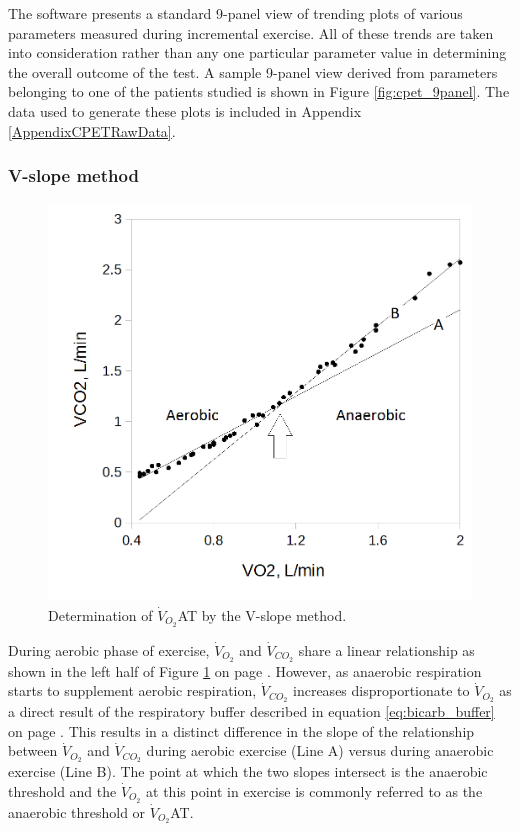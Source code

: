 The software presents a standard 9-panel view of trending plots of various parameters measured during incremental exercise. 
All of these trends are taken into consideration rather than any one particular parameter value in determining the overall outcome of the test. 
A sample 9-panel view derived from parameters belonging to one of the patients studied is shown in Figure \ref{fig:cpet_9panel}. 
The data used to generate these plots is included in Appendix \ref{AppendixCPETRawData}. 

\subsubsection{V-slope method}

\begin{figure}[htbp]
	\centering
	\includegraphics[width=\textwidth]{Figures/cpet_vslope}
	\caption{Determination of $\dot{V}_{O_2}$AT by the V-slope method.}
	\label{fig:cpet_vslope}
\end{figure}

During aerobic phase of exercise, $\dot{V}_{O_2}$ and $\dot{V}_{CO_2}$ share a linear relationship as shown in the left half of Figure \ref{fig:cpet_vslope} on page \pageref{fig:cpet_vslope}. 
However, as anaerobic respiration starts to supplement aerobic respiration, $\dot{V}_{CO_2}$ increases disproportionate to $\dot{V}_{O_2}$ as a direct result of the respiratory buffer described in equation \ref{eq:bicarb_buffer} on page \pageref{eq:bicarb_buffer}. 
This results in a distinct difference in the slope of the relationship between $\dot{V}_{O_2}$ and $\dot{V}_{CO_2}$ during aerobic exercise (Line A) versus during anaerobic exercise (Line B). 
The point at which the two slopes intersect is the anaerobic threshold and the $\dot{V}_{O_2}$ at this point in exercise is commonly referred to as the anaerobic threshold or $\dot{V}_{O_2}$AT.

